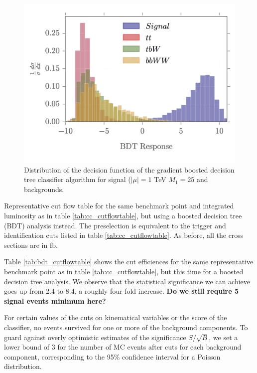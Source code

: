 \documentclass[a4paper,11pt]{article}
\newcommand{\Shufang}[1]{{\bf\color{Maroon}  #1}}
\begin{document}
\begin{figure}[h]
\centering
\includegraphics[trim = {0 0.5cm 0 0},clip]{images/bdt_response_png}
\caption{Distribution of the decision function of the gradient boosted decision
tree classifier algorithm for signal ($|\mu| = 1$ TeV $M_1 = 25$ and
backgrounds. }
\label{fig:bdt_response}
\end{figure}

\begin{table}[h]
  \centering
  
  \caption{Representative cut flow table for the same benchmark point and
    integrated luminosity as in table \ref{tab:cc_cutflowtable}, but using a
    boosted decision tree (BDT) analysis instead. The preselection is equivalent
    to the trigger and identification cuts listed in table
    \ref{tab:cc_cutflowtable}. As before, all the cross sections are in
  fb.  }
\label{tab:bdt_cutflowtable}
\end{table}

Table \ref{tab:bdt_cutflowtable} shows the cut efficiences for the same
representative benchmark point as in table \ref{tab:cc_cutflowtable}, but this
time for a boosted decision tree analysis. We observe that the statistical
significance we can achieve goes up from 2.4 to 8.4, a roughly four-fold
increase.  \Shufang{Do we still require 5 signal events minimum here?}

For certain values of the
cuts on kinematical variables or the score of the classifier, no events survived
for one or more of the background components. To guard against overly optimistic
estimates of the significance $S/\sqrt{B}$, we set a lower bound of 3 for the
number of MC events after cuts for each background component, corresponding to
the 95\% confidence interval for a Poisson distribution. 
\end{document}
